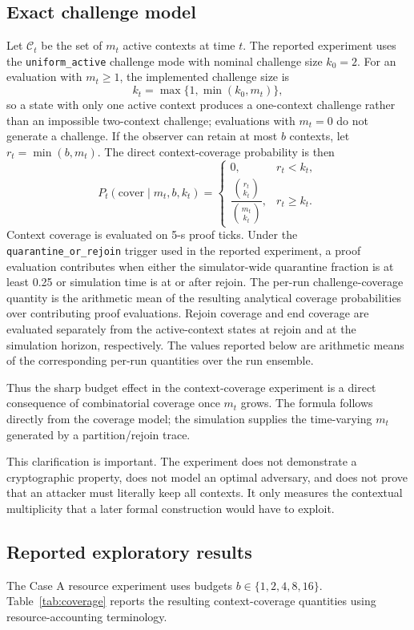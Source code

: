 \documentclass[11pt]{article}
\begin{document}
\subsection{Exact challenge model}
Let $\mathcal C_t$ be the set of $m_t$ active contexts at time $t$. The reported experiment uses the \texttt{uniform\_active} challenge mode with nominal challenge size $k_0=2$. For an evaluation with $m_t\ge1$, the implemented challenge size is
\[
k_t=\max\{1,\min(k_0,m_t)\},
\]
so a state with only one active context produces a one-context challenge rather than an impossible two-context challenge; evaluations with $m_t=0$ do not generate a challenge. If the observer can retain at most $b$ contexts, let $r_t=\min(b,m_t)$. The direct context-coverage probability is then
\[
P_t(\mathrm{cover}\mid m_t,b,k_t)=
\begin{cases}
0,& r_t<k_t,\\[4pt]
\dfrac{\binom{r_t}{k_t}}{\binom{m_t}{k_t}},& r_t\ge k_t.
\end{cases}
\]
Context coverage is evaluated on 5-s proof ticks. Under the \texttt{quarantine\_or\_rejoin} trigger used in the reported experiment, a proof evaluation contributes when either the simulator-wide quarantine fraction is at least 0.25 or simulation time is at or after rejoin. The per-run challenge-coverage quantity is the arithmetic mean of the resulting analytical coverage probabilities over contributing proof evaluations. Rejoin coverage and end coverage are evaluated separately from the active-context states at rejoin and at the simulation horizon, respectively. The values reported below are arithmetic means of the corresponding per-run quantities over the run ensemble.

Thus the sharp budget effect in the context-coverage experiment is a direct consequence of combinatorial coverage once $m_t$ grows. The formula follows directly from the coverage model; the simulation supplies the time-varying $m_t$ generated by a partition/rejoin trace.

This clarification is important. The experiment does not demonstrate a cryptographic property, does not model an optimal adversary, and does not prove that an attacker must literally keep all contexts. It only measures the contextual multiplicity that a later formal construction would have to exploit.

\subsection{Reported exploratory results}
The Case A resource experiment uses budgets $b\in\{1,2,4,8,16\}$. Table~\ref{tab:coverage} reports the resulting context-coverage quantities using resource-accounting terminology.
\end{document}

